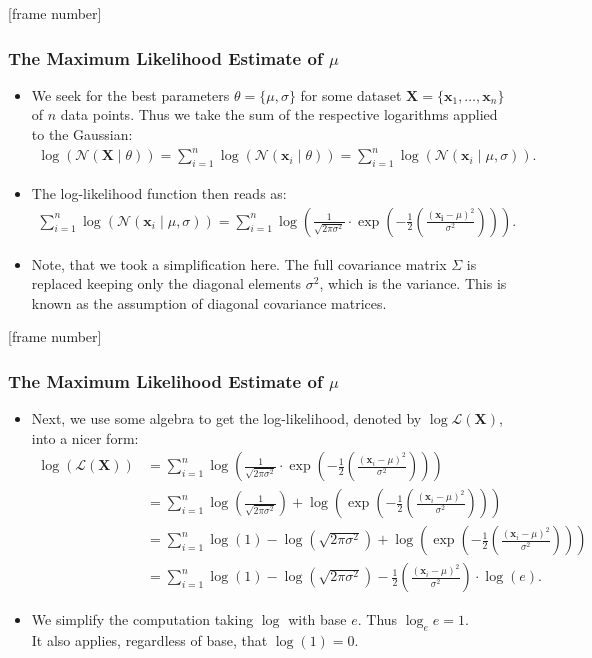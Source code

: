 \documentclass[aspectratio=169,t,xcolor=dvipsnames]{beamer}
\begin{document}
{
[frame number]
\begin{frame}
	\frametitle{The Maximum Likelihood Estimate of $\mu$}
	\begin{itemize}
		\item We seek for the best parameters $\theta = \{\mu, \sigma\}$ for some dataset $\mathbf{X} = \{\mathbf{x}_1,\ldots,\mathbf{x}_n\}$ of $n$ data points. Thus we take the sum of the respective logarithms applied to the Gaussian:
    \begin{align}
      \log\left(\mathcal{N}(\mathbf{X} \; \vert \; \theta)\right) = \sum_{i=1}^{n} \log\left( \mathcal{N}(\mathbf{x}_i \; \vert \; \theta)\right) = \sum_{i=1}^{n} \log\left( \mathcal{N}(\mathbf{x}_i \; \vert \; \mu, \sigma)\right).
    \end{align}
    \item The log-likelihood function then reads as:
    \begin{align}
      \sum_{i=1}^{n} \log\left(\mathcal{N}(\mathbf{x}_i \; \vert \; \mu, \sigma)\right) = \sum_{i=1}^{n} \log\left(\frac{1}{\sqrt{2\pi\sigma^2}} \cdot \exp \left( -\frac{1}{2} \left( \frac{(\mathbf{x_i}-\mu)^2}{\sigma^2} \right) \right)\right).
    \end{align}
    \item Note, that we took a simplification here. The full covariance matrix $\Sigma$ is replaced keeping only the diagonal elements $\sigma^2$, which is the variance. This is known as the assumption of diagonal covariance matrices.
	\end{itemize}
\end{frame}
}

{
[frame number]
\begin{frame}
	\frametitle{The Maximum Likelihood Estimate of $\mu$}
	\begin{itemize}
		\item Next, we use some algebra to get the log-likelihood, denoted by $\log \mathcal{L}(\mathbf{X})$, into a nicer form:
    \begin{align}
      \log\left(\mathcal{L}(\mathbf{X})\right) &= \sum_{i=1}^{n} \log\left(\frac{1}{\sqrt{2\pi\sigma^2}} \cdot \exp\left( -\frac{1}{2} \left( \frac{(\mathbf{x}_i-\mu)^2}{\sigma^2} \right)\right)\right) \\
      &= \sum_{i=1}^{n} \log\left(\frac{1}{\sqrt{2\pi\sigma^2}}\right) + \log\left(\exp\left( -\frac{1}{2} \left( \frac{(\mathbf{x}_i-\mu)^2}{\sigma^2} \right)\right)\right)\\
      &= \sum_{i=1}^{n} \log(1) - \log(\sqrt{2\pi\sigma^2}) + \log\left(\exp\left( -\frac{1}{2} \left( \frac{(\mathbf{x}_i-\mu)^2}{\sigma^2} \right)\right)\right)\\
      &= \sum_{i=1}^{n} \log(1) - \log\left(\sqrt{2\pi\sigma^2}\right) - \frac{1}{2} \left( \frac{(\mathbf{x}_i-\mu)^2}{\sigma^2} \right) \cdot \log(e).
    \end{align}
    \item We simplify the computation taking $\log$ with base $e$. Thus $\log_e e = 1$. \\
    It also applies, regardless of base, that $\log(1) = 0$.
	\end{itemize}
\end{frame}
}
\end{document}
